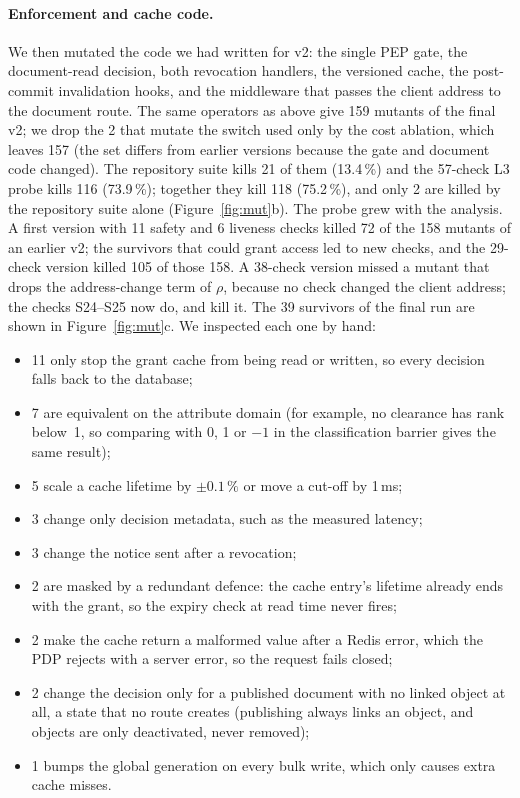 \paragraph{Enforcement and cache code.} We then mutated the code we had written for v2: the single PEP gate, the
document-read decision, both revocation handlers, the versioned cache, the post-commit invalidation hooks, and the
middleware that passes the client address to the document route. The same operators as above give 159 mutants of
the final v2; we drop the 2 that mutate the switch used only by the cost ablation, which leaves 157 (the set
differs from earlier versions because the gate and document code changed). The repository suite kills 21 of them
(13.4\,\%) and the 57-check L3 probe kills 116 (73.9\,\%); together they kill 118 (75.2\,\%), and only 2 are
killed by the repository suite alone (Figure~\ref{fig:mut}b). The probe grew with the analysis. A first version
with 11 safety and 6 liveness checks killed 72 of the 158 mutants of an earlier v2; the survivors that could grant
access led to new checks, and the 29-check version killed 105 of those 158. A 38-check version missed a mutant
that drops the address-change term of $\rho$, because no check changed the client address; the checks S24--S25
now do, and kill it. The 39 survivors of the final run are shown in Figure~\ref{fig:mut}c. We inspected each one
by hand:
\begin{itemize}
\item 11 only stop the grant cache from being read or written, so every decision falls back to the database;
\item 7 are equivalent on the attribute domain (for example, no clearance has rank below~1, so comparing with 0, 1
or $-1$ in the classification barrier gives the same result);
\item 5 scale a cache lifetime by $\pm0.1\,\%$ or move a cut-off by 1\,ms;
\item 3 change only decision metadata, such as the measured latency;
\item 3 change the notice sent after a revocation;
\item 2 are masked by a redundant defence: the cache entry's lifetime already ends with the grant, so the expiry
check at read time never fires;
\item 2 make the cache return a malformed value after a Redis error, which the PDP rejects with a server error,
so the request fails closed;
\item 2 change the decision only for a published document with no linked object at all, a state that no route
creates (publishing always links an object, and objects are only deactivated, never removed);
\item 1 bumps the global generation on every bulk write, which only causes extra cache misses.
\end{itemize}
